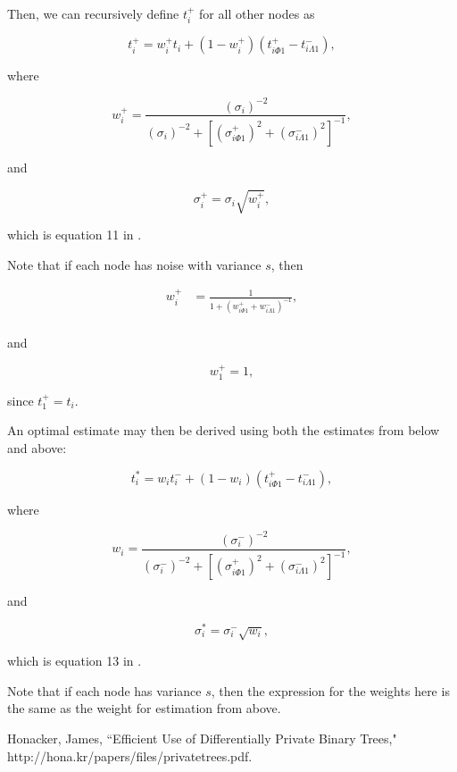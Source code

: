 \documentclass[11pt, oneside]{article}
\begin{document}
Then, we can recursively define $t_i^+$ for all other nodes as  

$$ t_i^+ = w_i^+ t_i + (1-w_i^+) (t_{i\Phi1}^+ - t_{i \Lambda 1}^-),$$

where 

$$ w_i^+ = \frac{(\sigma_i)^{-2}}{(\sigma_i)^{-2} + \left[(\sigma^+_{i\Phi 1})^2 + (\sigma^-_{i \Lambda 1})^2\right]^{-1}},$$

and 

$$ \sigma^+_i = \sigma_i \sqrt{w_i^+},$$

which is equation 11 in \cite{honacker}.

Note that if each node has noise with variance $s$, then 

\begin{align*}
w_i^+ &= \frac{1}{1 + (w_{i \Phi 1}^+ + w_{i \Lambda 1}^-)^{-1}}, \\
\end{align*}

and

$$w_1^+ = 1,$$

since $t_1^+ = t_i$.

An optimal estimate may then be derived using both the estimates from below and above: 

$$ t_i^* = w_i t_i^- + (1-w_i) (t_{i \Phi 1} ^+ - t_{i \Lambda 1}^-),$$

where

$$ w_i = \frac{(\sigma_i^-)^{-2}}{(\sigma_i^-)^{-2} + \left[(\sigma_{i\Phi 1}^+)^2 + (\sigma_{i \Lambda 1}^-)^2\right]^{-1}}, $$

and 

$$ \sigma_i^* = \sigma_i^-\sqrt{w_i},$$

which is equation 13 in \cite{honacker}.

Note that if each node has variance $s$, then the expression for the weights here is the same as the weight for estimation from above.

\begin{thebibliography}{2}
	  Honacker, James, ``Efficient Use of Differentially Private Binary Trees," http://hona.kr/papers/files/privatetrees.pdf.
\end{thebibliography}
\end{document}
